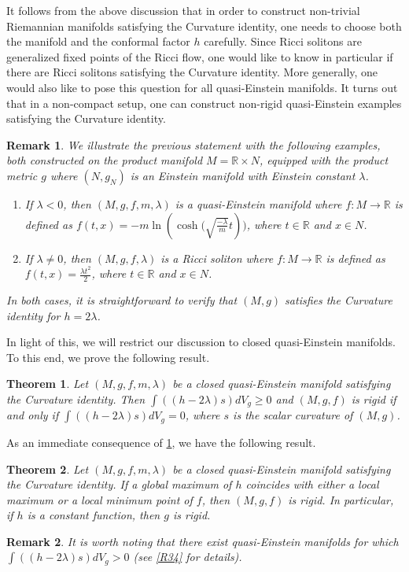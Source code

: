 \documentclass[12pt]{amsart}
\newtheorem{thm}{Theorem}
\newtheorem{rmk}{Remark}
\theoremstyle{definition}
\numberwithin{equation}{section}
\begin{document}
It follows from the above discussion that in order to construct non-trivial Riemannian manifolds satisfying the Curvature identity, one needs to choose both the manifold and the conformal factor $h$ carefully. Since Ricci solitons are generalized fixed points of the Ricci flow, one would like to know in particular if there are Ricci solitons satisfying the Curvature identity.
More generally, one would also like to pose this question for all quasi-Einstein manifolds. It turns out that in a non-compact setup, one can construct non-rigid quasi-Einstein examples satisfying the Curvature identity.
\begin{rmk}
     We illustrate the previous statement with the following examples, both constructed on the product manifold $M = \mathbb{R} \times N$, equipped with the product metric $g$ where $(N,g_{N})$ is an Einstein manifold with Einstein constant $\lambda$.
    \begin{enumerate}
        \item If  $\lambda < 0$, then $(M,g,f,m,\lambda)$ is a quasi-Einstein manifold where $f : M \rightarrow \mathbb{R}$ is defined as $f(t,x) = - m\ln({\cosh({\sqrt{\frac{-\lambda}{m}}t}}))$, where $t \in \mathbb{R}$ and $x \in N$. 
        \item If $\lambda \neq 0$, then $(M,g,f,\lambda)$ is a Ricci soliton where 
        $f : M \rightarrow \mathbb{R}$ is defined as $f(t,x) = \frac{\lambda t^{2}}{2}$, where $t \in \mathbb{R}$ and $x \in N$.
    \end{enumerate}
    In both cases, it is straightforward to verify that $(M,g)$ satisfies the Curvature identity for $h = 2\lambda$.
\end{rmk}
In light of this, we will restrict our discussion to closed quasi-Einstein manifolds. To this end, we prove the following result.
\begin{thm}\label{MF}
Let $(M,g,f,m,\lambda)$ be a closed quasi-Einstein manifold satisfying the Curvature identity. Then $\int ((h-2\lambda)s)dV_{g} \geq 0$ and $(M,g,f)$ is rigid if and only if $\int ((h-2\lambda)s)dV_{g} = 0$, where $s$ is the scalar curvature of $(M,g)$.
\end{thm}
\noindent As an immediate consequence of \cref{MF}, we have the following result.
\begin{thm}\label{CF}
   Let $(M,g,f,m,\lambda)$ be a closed quasi-Einstein manifold satisfying the Curvature identity. If a global maximum of $h$ coincides with either a local maximum or a local minimum point of $f$, then $(M,g,f)$ is rigid. In particular, if $h$ is a constant function, then $g$ is rigid.
\end{thm}
\begin{rmk}
It is worth noting that there exist quasi-Einstein manifolds for which $\int((h -2\lambda)s)dV_{g} > 0$ (see \cref{R34} for details).
\end{rmk}
\end{document}
